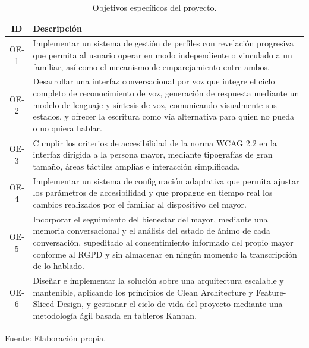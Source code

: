 {\setlength{\intextsep}{6pt}%
\begin{table}[H]
    \centering
    \caption{Objetivos específicos del proyecto.}
    \label{tab:objetivos}
    \small
    \begin{tabularx}{\textwidth}{@{}c >{\RaggedRight\arraybackslash}X@{}}
        \toprule
        \textbf{ID} & \textbf{Descripción} \\
        \midrule
        OE-1 & Implementar un sistema de gestión de perfiles con revelación progresiva que permita al usuario operar en modo independiente o vinculado a un familiar, así como el mecanismo de emparejamiento entre ambos. \\
        \addlinespace[2pt]
        OE-2 & Desarrollar una interfaz conversacional por voz que integre el ciclo completo de reconocimiento de voz, generación de respuesta mediante un modelo de lenguaje y síntesis de voz, comunicando visualmente sus estados, y ofrecer la escritura como vía alternativa para quien no pueda o no quiera hablar. \\
        \addlinespace[2pt]
        OE-3 & Cumplir los criterios de accesibilidad de la norma WCAG 2.2 en la interfaz dirigida a la persona mayor, mediante tipografías de gran tamaño, áreas táctiles amplias e interacción simplificada. \\
        \addlinespace[2pt]
        OE-4 & Implementar un sistema de configuración adaptativa que permita ajustar los parámetros de accesibilidad y que propague en tiempo real los cambios realizados por el familiar al dispositivo del mayor. \\
        \addlinespace[2pt]
        OE-5 & Incorporar el seguimiento del bienestar del mayor, mediante una memoria conversacional y el análisis del estado de ánimo de cada conversación, supeditado al consentimiento informado del propio mayor conforme al RGPD y sin almacenar en ningún momento la transcripción de lo hablado. \\
        \addlinespace[2pt]
        OE-6 & Diseñar e implementar la solución sobre una arquitectura escalable y mantenible, aplicando los principios de Clean Architecture y Feature-Sliced Design, y gestionar el ciclo de vida del proyecto mediante una metodología ágil basada en tableros Kanban. \\
        \bottomrule
    \end{tabularx}

    \vspace{2pt}
    {\footnotesize Fuente: Elaboración propia.}
\end{table}}

